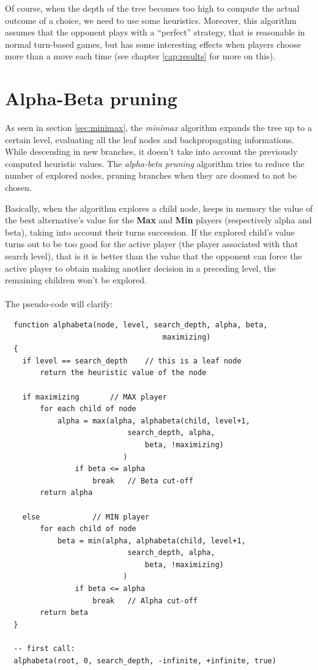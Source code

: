 Of course, when the depth of the tree becomes too high to compute the actual outcome of a choice, we need to use some heuristics. Moreover, this algorithm assumes that the opponent plays with a ``perfect'' strategy, that is reasonable in normal turn-based games, but has some interesting effects when players choose more than a move each time (see chapter \ref{cap:results} for more on this).

\section{Alpha-Beta pruning}
As seen in section \ref{sec:minimax}, the \textit{minimax} algorithm expands the tree up to a certain level, evaluating all the leaf nodes and backpropagating informations.
While descending in new branches, it doesn't take into account the previously computed heuristic values.
The \textit{alpha-beta pruning} algorithm tries to reduce the number of explored nodes, pruning branches when they are doomed to not be chosen.

Basically, when the algorithm explores a child node, keeps in memory the value of the best alternative's value for the \textbf{Max} and \textbf{Min} players (respectively alpha and beta), taking into account their turns succession.
If the explored child's value turns out to be too good for the active player (the player associated with that search level), that is it is better than the value that the opponent can force the active player to obtain making another decision in a preceding level, the remaining children won't be explored.\\
\\
The pseudo-code will clarify:\\
{\footnotesize
\lstset{language=C}
\begin{lstlisting}
  function alphabeta(node, level, search_depth, alpha, beta,
                     				maximizing)
  {
    if level == search_depth	// this is a leaf node
    	return the heuristic value of the node
    
    if maximizing		// MAX player
    	for each child of node
        	alpha = max(alpha, alphabeta(child, level+1,
                			search_depth, alpha,
                        		beta, !maximizing)
                           )
                if beta <= alpha
                	break	// Beta cut-off
        return alpha
        
    else			// MIN player
    	for each child of node
        	beta = min(alpha, alphabeta(child, level+1,
                			search_depth, alpha,
                        		beta, !maximizing)
                           )
                if beta <= alpha
                	break	// Alpha cut-off
        return beta
  }
  
  -- first call:
  alphabeta(root, 0, search_depth, -infinite, +infinite, true)
\end{lstlisting}
}

